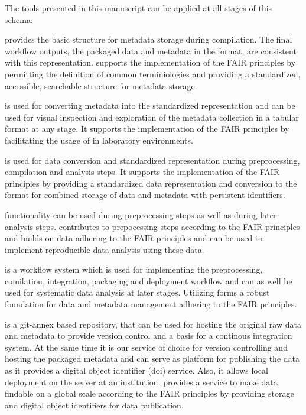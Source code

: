 The tools presented in this manuscript can be applied at all stages of this schema:
\begin{description}
 \setlength\itemsep{0pt}
 \item[\software{odML}] provides the basic structure for metadata storage during compilation. The final workflow outputs, the packaged data and metadata in the  format, are consistent with this representation.  supports the implementation of the FAIR principles by permitting the definition of common terminiologies and providing a standardized, accessible, searchable structure for metadata storage. 
 \item[\software{odMLtables}] is used for converting metadata into the standardized  representation and can be used for visual inspection and exploration of the metadata collection in a tabular format at any stage. It supports the implementation of the FAIR principles by facilitating the usage of  in laboratory environments.
 \item[\software{Neo}] is used for data conversion and standardized representation during preprocessing, compilation and analysis steps. It supports the implementation of the FAIR principles by providing a standardized data representation and conversion to the  format for combined storage of data and metadata with persistent identifiers.
 \item[\software{Elephant}] functionality can be used during preprocessing steps as well as during later analysis steps.  contributes to prepocessing steps according to the FAIR principles and builds on data adhering to the FAIR principles and can be used to implement reproducible data analysis using these data.
 \item[\software{snakemake}] is a workflow system which is used for implementing the preprocessing, comilation, integration, packaging and deployment workflow and can as well be used for systematic data analysis at later stages. Utilizing  forms a robust foundation for data and metadata management adhering to the FAIR principles.
 \item[\software{Gin}] is a git-annex based repository, that can be used for hosting the original raw data and metadata to provide version control and a basis for a continous integration system. At the same time it is our service of choice for version controlling and hosting the packaged metadata and can serve as platform for publishing the data as it provides a digital object identifier (doi) service. Also, it allows local deployment on the server at an institution.  provides a service to make data findable on a global scale according to the FAIR principles by providing storage and digital object identifiers for data publication.
\end{description}

